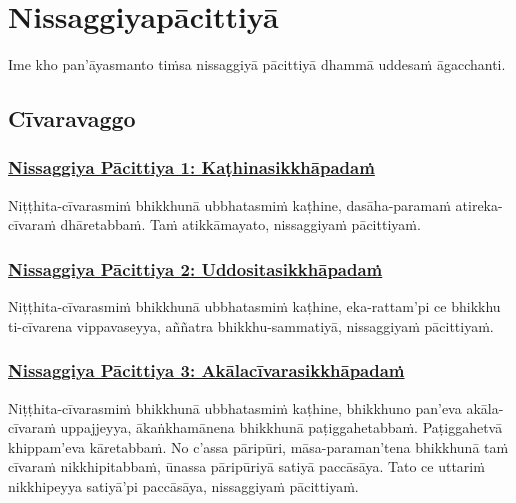 \section{Nissaggiyapācittiyā}
\label{np}

\begin{intro}
  Ime kho pan'āyasmanto tiṁsa nissaggiyā pācittiyā dhammā uddesaṁ āgacchanti.
\end{intro}

\setsubsecheadstyle{\subsectionFmt}
\subsection{Cīvaravaggo}
\vspace{0.2cm}

\subsubsection*{\hyperref[forf-exp1]{Nissaggiya Pācittiya 1: Kaṭhinasikkhāpadaṁ}}
\label{np1}

Niṭṭhita-cīvarasmiṁ bhikkhunā ubbhatasmiṁ kaṭhine, dasāha-paramaṁ atireka-cīvaraṁ dhāretabbaṁ. Taṁ atikkāmayato, nissaggiyaṁ pācittiyaṁ.

\subsubsection*{\hyperref[forf-exp2]{Nissaggiya Pācittiya 2: Uddositasikkhāpadaṁ}}
\label{np2}

Niṭṭhita-cīvarasmiṁ bhikkhunā ubbhatasmiṁ kaṭhine, eka-rattam'pi ce bhikkhu ti-cīvarena vippavaseyya, aññatra bhikkhu-sammatiyā, nissaggiyaṁ pācittiyaṁ.

\subsubsection*{\hyperref[forf-exp3]{Nissaggiya Pācittiya 3: Akālacīvarasikkhāpadaṁ}}
\label{np3}

Niṭṭhita-cīvarasmiṁ bhikkhunā ubbhatasmiṁ kaṭhine, bhikkhuno pan’eva akāla-cīvaraṁ uppajjeyya, ākaṅkhamānena bhikkhunā paṭiggahetabbaṁ. Paṭiggahetvā khippam’eva kāretabbaṁ. No c’assa pāripūri, māsa-paraman’tena bhikkhunā taṁ cīvaraṁ nikkhipitabbaṁ, ūnassa pāripūriyā satiyā paccāsāya. Tato ce uttariṁ nikkhipeyya satiyā'pi paccāsāya, nissaggiyaṁ pācittiyaṁ.

